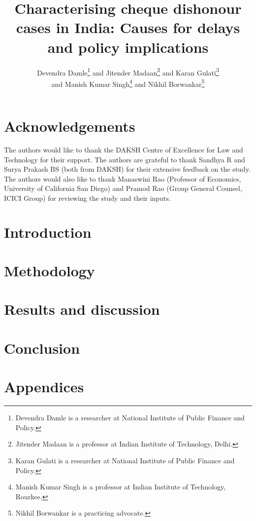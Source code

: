 \documentclass[12pt,a4paper]{article}
\title{Characterising cheque dishonour cases in India: Causes for delays and policy implications}
\author{Devendra Damle\thanks{Devendra Damle is a researcher at National Institute of Public Finance and Policy.} and Jitender Madaan\thanks{Jitender Madaan is a professor at Indian Institute of Technology, Delhi.} and Karan Gulati\thanks{Karan Gulati is a researcher at National Institute of Public Finance and Policy.}\\ and Manish Kumar Singh\thanks{Manish Kumar Singh is a professor at Indian Institute of Technology, Rourkee.} and Nikhil Borwankar\thanks{Nikhil Borwankar is a practicing advocate.}}
\begin{document}
\maketitle

\begin{abstract}

\end{abstract}

\newpage
\tableofcontents
\newpage
\printglossaries
\newpage

\section*{Acknowledgements}
The authors would like to thank the DAKSH Centre of Excellence for Law and Technology for their support. The authors are grateful to thank Sandhya R and Surya Prakash BS (both from DAKSH) for their extensive feedback on the study. The authors would also like to thank Manaswini Rao (Professor of Economics, University of California San Diego) and Pramod Rao (Group General Counsel, ICICI Group) for reviewing the study and their inputs.

\newpage
\section{Introduction}
\label{sec:introduction}


\section{Methodology}
\label{sec:methodology}


\section{Results and discussion}
\label{sec:results}


\section{Conclusion}
\label{sec:conclusion}


\newpage
\printbibliography[heading=bibintoc]
\newpage

\appendix
\section{Appendices}
\label{sec:appendices}

\end{document}
